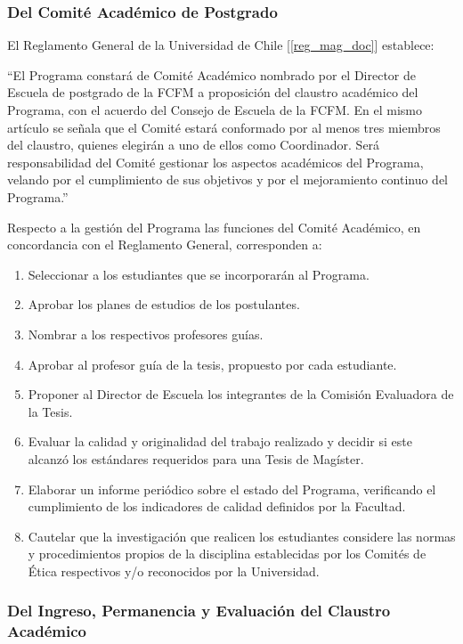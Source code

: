 \subsubsection{Del Comité Académico de Postgrado}

El Reglamento General de la Universidad de Chile [\ref{reg_mag_doc}] establece:

``El Programa constará de Comité Académico nombrado por el Director de Escuela de postgrado
de la FCFM a proposición del claustro académico del Programa, con el acuerdo del Consejo de
Escuela de la FCFM. En el mismo artículo se señala que el Comité estará conformado por al
menos tres miembros del claustro, quienes elegirán a uno de ellos como Coordinador. Será
responsabilidad del Comité gestionar los aspectos académicos del Programa, velando por el
cumplimiento de sus objetivos y por el mejoramiento continuo del Programa.''

Respecto a la gestión del Programa las funciones del Comité Académico, en concordancia con
el Reglamento General, corresponden a:

\begin{enumerate}
\item Seleccionar a los estudiantes que se incorporarán al Programa.
\item Aprobar los planes de estudios de los postulantes.
\item Nombrar a los respectivos profesores guías.
\item Aprobar al profesor guía de la tesis, propuesto por cada estudiante.
\item Proponer al Director de Escuela los integrantes de la Comisión Evaluadora de la Tesis.
\item Evaluar la calidad y originalidad del trabajo realizado y decidir si este alcanzó los
estándares requeridos para una Tesis de Magíster.
\item Elaborar un informe periódico sobre el estado del Programa, verificando el cumplimiento de
los indicadores de calidad definidos por la Facultad.
\item Cautelar que la investigación que realicen los estudiantes considere las normas y
procedimientos propios de la disciplina establecidas por los Comités de Ética respectivos
y/o reconocidos por la Universidad.
\end{enumerate}

\subsubsection{Del Ingreso, Permanencia y Evaluación del Claustro Académico}
\label{ing_perm_eval}

